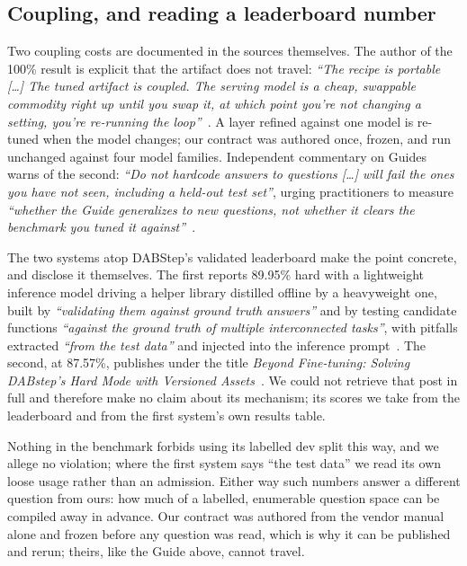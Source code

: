 \subsection{Coupling, and reading a leaderboard number}

Two coupling costs are documented in the sources themselves. The author of the
100\% result is explicit that the artifact does not travel: \emph{``The recipe
is portable [\ldots] The tuned artifact is coupled. The serving model is a
cheap, swappable commodity right up until you swap it, at which point you're not
changing a setting, you're re-running the loop''}~\cite{motherduck-semantic}. A
layer refined against one model is re-tuned when the model changes; our contract
was authored once, frozen, and run unchanged against four model families.
Independent commentary on Guides warns of the second: \emph{``Do not hardcode
answers to questions [\ldots] will fail the ones you have not seen, including a
held-out test set''}, urging practitioners to measure \emph{``whether the Guide
generalizes to new questions, not whether it clears the benchmark you tuned it
against''}~\cite{corrdyn-guides}.

The two systems atop DABStep's validated leaderboard make the point concrete,
and disclose it themselves. The first reports 89.95\% hard with a lightweight
inference model driving a helper library distilled offline by a heavyweight
one, built by \emph{``validating them against ground truth answers''} and by
testing candidate functions \emph{``against the ground truth of multiple
interconnected tasks''}, with pitfalls extracted \emph{``from the test
data''} and injected into the inference prompt~\cite{nvidia-kgmon}. The
second, at 87.57\%, publishes under the title \emph{Beyond Fine-tuning:
Solving DABstep's Hard Mode with Versioned
Assets}~\cite{oceanbase-datapilot}. We could not retrieve that post in full
and therefore make no claim about its mechanism; its scores we take from the
leaderboard and from the first system's own results table.

Nothing in the benchmark forbids using its labelled dev split this way, and we
allege no violation; where the first system says ``the test data'' we read its
own loose usage rather than an admission. Either way such numbers answer a
different question from ours: how much of a labelled, enumerable question space
can be compiled away in advance. Our contract was authored from the vendor
manual alone and frozen before any question was read, which is why it can be
published and rerun; theirs, like the Guide above, cannot travel.

